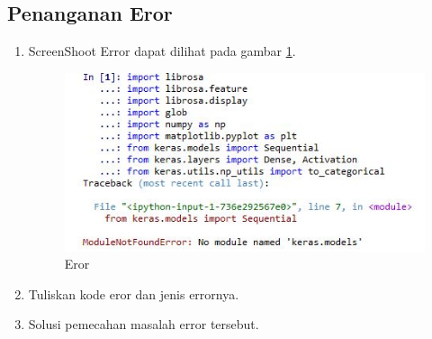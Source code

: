 \subsection{Penanganan Eror}
\begin{enumerate}
\item ScreenShoot Error dapat dilihat pada gambar \ref{c6t_17}.
\begin{figure}[!htbp]
\centerline{\includegraphics[width=1\textwidth]{figures/c6t/eror.JPG}}
\caption{Eror}
\label{c6t_17}
\end{figure}
\item Tuliskan kode eror dan jenis errornya.

\item Solusi pemecahan masalah error tersebut.

\end{enumerate}
